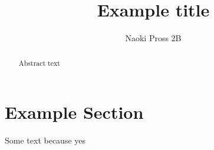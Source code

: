 \documentclass[a4paper]{article}        %
\begin{document}
	\author{Naoki Pross 2B}
	\title{Example title}
	\maketitle

    \begin{abstract}
        Abstract text
    \end{abstract}
	
	\section{Example Section}
        Some text because yes
    
\end{document}
